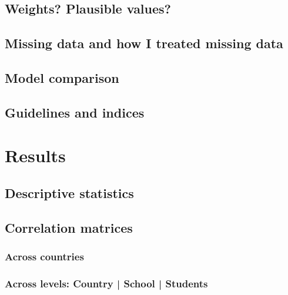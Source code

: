\documentclass[a4paper,11pt,UKenglish,twoside,openright]{report}\usepackage[]{graphicx}\usepackage[]{color}
\begin{document}
\section{Weights? Plausible values?}

\section{Missing data and how I treated missing data}

\section{Model comparison}

\section{Guidelines and indices}



\chapter{Results}
\label{chp:4}



\section{Descriptive statistics}

\section{Correlation matrices}

\subsection{Across countries}

\subsection{Across levels: Country | School | Students}
\end{document}
